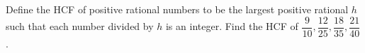 Define the HCF of positive rational numbers to be the largest positive rational $h$ such that each number divided by $h$ is an integer. Find the HCF of $\dfrac{9}{10},\dfrac{12}{25},\dfrac{18}{35},\dfrac{21}{40}$.
